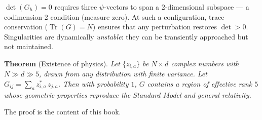 $\det(G_h) = 0$ requires three $\psi$-vectors to span a 2-dimensional subspace --- a codimension-2 condition (measure zero).  At such a configuration, trace conservation ($\operatorname{Tr}(G) = N$) ensures that any perturbation restores $\det > 0$.  Singularities are dynamically \emph{unstable}: they can be transiently approached but not maintained.

\bigskip

\noindent\textbf{Theorem} (Existence of physics). \emph{Let $\{z_{i,a}\}$ be $N \times d$ complex numbers with $N \gg d \gg 5$, drawn from any distribution with finite variance. Let $G_{ij} = \sum_a z^*_{i,a}\,z_{j,a}$. Then with probability $1$, $G$ contains a region of effective rank $5$ whose geometric properties reproduce the Standard Model and general relativity.}

\bigskip

\noindent The proof is the content of this book.
